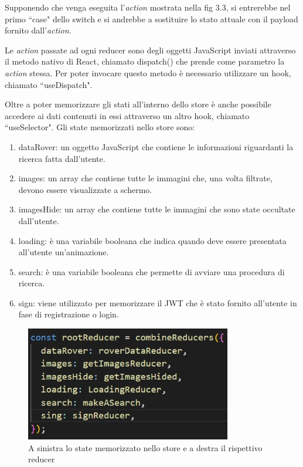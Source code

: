 Supponendo che venga eseguita l'\textit{action} mostrata nella fig 3.3, si entrerebbe nel primo ``case" dello switch e si andrebbe a sostituire lo stato attuale con il payload fornito dall'\textit{action}.

Le \textit{action} passate ad ogni reducer sono degli oggetti JavaScript inviati attraverso il metodo nativo di React, chiamato dispatch() che prende come parametro la \textit{action} stessa. Per poter invocare questo metodo 
\`e necessario utilizzare un hook, chiamato ``useDispatch".

Oltre a poter memorizzare gli stati all'interno dello store \`e anche possibile accedere ai dati contenuti in essi attraverso un altro hook, chiamato ``useSelector".
Gli state memorizzati nello store sono:
\begin{enumerate}
    \item dataRover: un oggetto JavaScript che contiene le informazioni riguardanti la ricerca fatta dall'utente.
    \item images: un array che contiene tutte le immagini che, una volta filtrate, devono essere visualizzate a schermo.
    \item imagesHide: un array che contiene tutte le immagini che sono state occultate dall'utente.
    \item loading: \`e una variabile booleana che indica quando deve essere presentata all'utente un'animazione.
    \item search: \`e una variabile booleana che permette di avviare una procedura di ricerca.
    \item sign: viene utilizzato per memorizzare il JWT che \`e stato fornito all'utente in fase di registrazione o login.
\end{enumerate}
\begin{figure}[h]
    \centering
    \includegraphics[width=9cm, height=5cm]{images/state.jpg}
    \caption[differenzeiteot]{A sinistra lo state memorizzato nello store e a destra il rispettivo reducer}
    \label{fig:state}
\end{figure}
